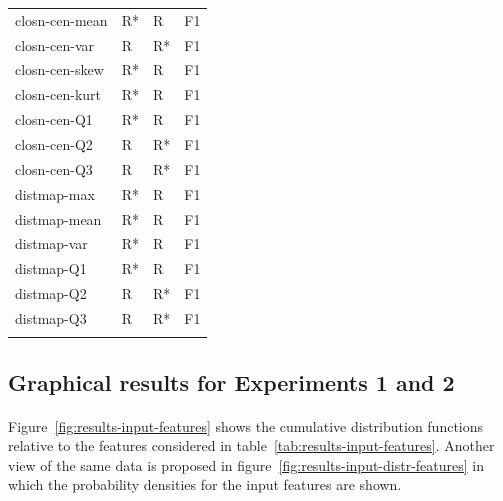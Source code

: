 \begin{longtable}{llll}
		closn-cen-mean                &     R* &    R &    F1 \\
		closn-cen-var                 &      R &   R* &    F1 \\
		closn-cen-skew                &     R* &    R &    F1 \\
		closn-cen-kurt                &     R* &    R &    F1 \\
		closn-cen-Q1                  &     R* &    R &    F1 \\
		closn-cen-Q2                  &      R &   R* &    F1 \\
		closn-cen-Q3                  &      R &   R* &    F1 \\
		distmap-max                   &     R* &    R &    F1 \\
		distmap-mean                  &     R* &    R &    F1 \\
		distmap-var                   &     R* &    R &    F1 \\
		distmap-Q1                    &     R* &    R &    F1 \\
		distmap-Q2                    &      R &   R* &    F1 \\
		distmap-Q3                    &      R &   R* &    F1 \\
		\label{tab:results-other-features}
	\end{longtable}

\subsection{Graphical results for Experiments 1 and 2}
\paragraph{} Figure~\ref{fig:results-input-features} shows the cumulative distribution functions relative to the features considered in table~\ref{tab:results-input-features}. Another view of the same data is proposed in figure~\ref{fig:results-input-distr-features} in which the probability densities for the input features are shown.

